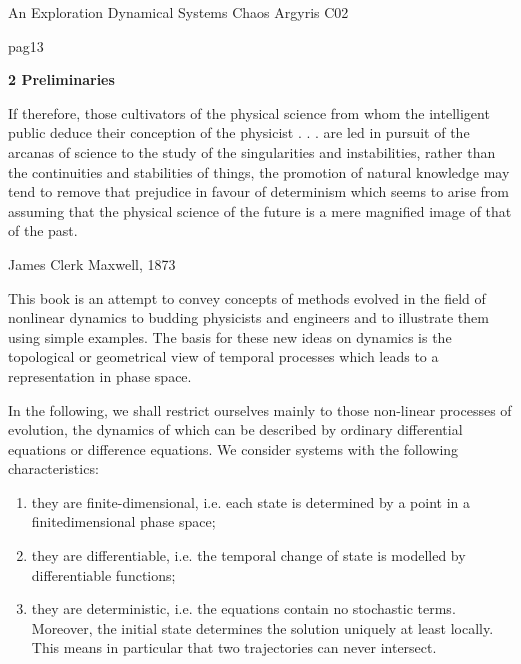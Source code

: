 \documentclass[12pt]{article}
\begin{document}
An Exploration Dynamical Systems Chaos Argyris C02

\hfill

pag13

\hfill

\textbf{2 Preliminaries}

\hfill

If therefore, those cultivators of the physical science from whom the
intelligent public deduce their conception of the physicist . . . are led
in pursuit of the arcanas of science to the study of the singularities
and instabilities, rather than the continuities and stabilities of things,
the promotion of natural knowledge may tend to remove that prejudice
in favour of determinism which seems to arise from assuming
that the physical science of the future is a mere magnified image of
that of the past.

James Clerk Maxwell, 1873

\hfill

This book is an attempt to convey concepts of methods evolved in the field of nonlinear
dynamics to budding physicists and engineers and to illustrate them using
simple examples. The basis for these new ideas on dynamics is the topological or geometrical
view of temporal processes which leads to a representation in phase space.

\hfill

In the following, we shall restrict ourselves mainly to those non-linear processes of
evolution, the dynamics of which can be described by ordinary differential equations
or difference equations. We consider systems with the following characteristics:

\begin{enumerate}[label=\roman*]
\item they are finite-dimensional, i.e. each state is determined by a point in a finitedimensional
phase space;

\item they are differentiable, i.e. the temporal change of state is modelled by differentiable
functions;

\item they are deterministic, i.e. the equations contain no stochastic terms. Moreover,
the initial state determines the solution uniquely at least locally. This means in
particular that two trajectories can never intersect.
\end{enumerate}
\end{document}
